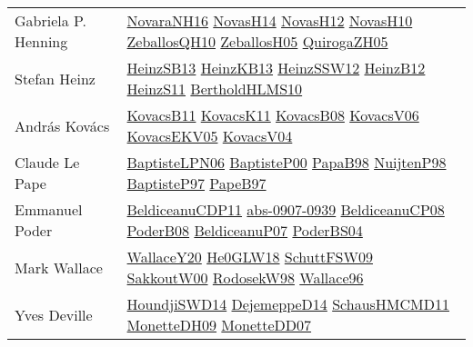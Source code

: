 {\begin{longtable}{p{4cm}p{20cm}}
Gabriela P. Henning & \href{articles/NovaraNH16.pdf}{NovaraNH16}\cite{NovaraNH16} \href{articles/NovasH14.pdf}{NovasH14}\cite{NovasH14} \href{articles/NovasH12.pdf}{NovasH12}\cite{NovasH12} \href{articles/NovasH10.pdf}{NovasH10}\cite{NovasH10} \href{articles/ZeballosQH10.pdf}{ZeballosQH10}\cite{ZeballosQH10} \href{articles/ZeballosH05.pdf}{ZeballosH05}\cite{ZeballosH05} \href{papers/QuirogaZH05.pdf}{QuirogaZH05}\cite{QuirogaZH05} \\
Stefan Heinz & \href{articles/HeinzSB13.pdf}{HeinzSB13}\cite{HeinzSB13} \href{papers/HeinzKB13.pdf}{HeinzKB13}\cite{HeinzKB13} \href{articles/HeinzSSW12.pdf}{HeinzSSW12}\cite{HeinzSSW12} \href{papers/HeinzB12.pdf}{HeinzB12}\cite{HeinzB12} \href{papers/HeinzS11.pdf}{HeinzS11}\cite{HeinzS11} \href{papers/BertholdHLMS10.pdf}{BertholdHLMS10}\cite{BertholdHLMS10} \\
Andr{\'{a}}s Kov{\'{a}}cs & \href{articles/KovacsB11.pdf}{KovacsB11}\cite{KovacsB11} \href{articles/KovacsK11.pdf}{KovacsK11}\cite{KovacsK11} \href{articles/KovacsB08.pdf}{KovacsB08}\cite{KovacsB08} \href{papers/KovacsV06.pdf}{KovacsV06}\cite{KovacsV06} \href{papers/KovacsEKV05.pdf}{KovacsEKV05}\cite{KovacsEKV05} \href{papers/KovacsV04.pdf}{KovacsV04}\cite{KovacsV04} \\
Claude Le Pape & \href{}{BaptisteLPN06}\cite{BaptisteLPN06} \href{articles/BaptisteP00.pdf}{BaptisteP00}\cite{BaptisteP00} \href{articles/PapaB98.pdf}{PapaB98}\cite{PapaB98} \href{articles/NuijtenP98.pdf}{NuijtenP98}\cite{NuijtenP98} \href{papers/BaptisteP97.pdf}{BaptisteP97}\cite{BaptisteP97} \href{}{PapeB97}\cite{PapeB97} \\
Emmanuel Poder & \href{articles/BeldiceanuCDP11.pdf}{BeldiceanuCDP11}\cite{BeldiceanuCDP11} \href{articles/abs-0907-0939.pdf}{abs-0907-0939}\cite{abs-0907-0939} \href{papers/BeldiceanuCP08.pdf}{BeldiceanuCP08}\cite{BeldiceanuCP08} \href{papers/PoderB08.pdf}{PoderB08}\cite{PoderB08} \href{papers/BeldiceanuP07.pdf}{BeldiceanuP07}\cite{BeldiceanuP07} \href{articles/PoderBS04.pdf}{PoderBS04}\cite{PoderBS04} \\
Mark Wallace & \href{articles/WallaceY20.pdf}{WallaceY20}\cite{WallaceY20} \href{papers/He0GLW18.pdf}{He0GLW18}\cite{He0GLW18} \href{papers/SchuttFSW09.pdf}{SchuttFSW09}\cite{SchuttFSW09} \href{articles/SakkoutW00.pdf}{SakkoutW00}\cite{SakkoutW00} \href{papers/RodosekW98.pdf}{RodosekW98}\cite{RodosekW98} \href{articles/Wallace96.pdf}{Wallace96}\cite{Wallace96} \\
Yves Deville & \href{papers/HoundjiSWD14.pdf}{HoundjiSWD14}\cite{HoundjiSWD14} \href{papers/DejemeppeD14.pdf}{DejemeppeD14}\cite{DejemeppeD14} \href{articles/SchausHMCMD11.pdf}{SchausHMCMD11}\cite{SchausHMCMD11} \href{papers/MonetteDH09.pdf}{MonetteDH09}\cite{MonetteDH09} \href{papers/MonetteDD07.pdf}{MonetteDD07}\cite{MonetteDD07} \\

\end{longtable}}
